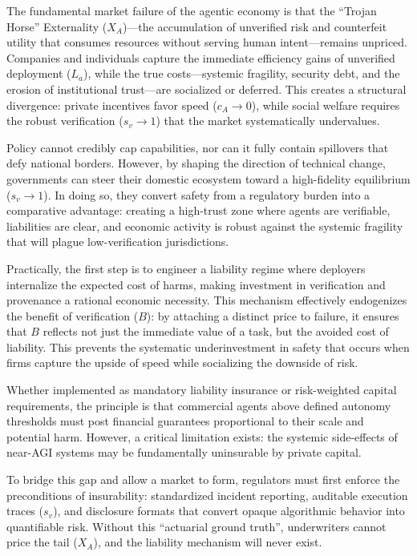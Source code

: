 \documentclass[12pt, letter]{article}
\begin{document}
The fundamental market failure of the agentic economy is that the ``Trojan Horse'' Externality ($X_A$)—the accumulation of unverified risk and counterfeit utility that consumes resources without serving human intent—remains unpriced. Companies and individuals capture the immediate efficiency gains of unverified deployment ($L_a$), while the true costs—systemic fragility, security debt, and the erosion of institutional trust—are socialized or deferred. This creates a structural divergence: private incentives favor speed ($c_A \to 0$), while social welfare requires the robust verification ($s_v \to 1$) that the market systematically undervalues.

Policy cannot credibly cap capabilities, nor can it fully contain spillovers that defy national borders. However, by shaping the direction of technical change, governments can steer their domestic ecosystem toward a high-fidelity equilibrium ($s_v \to 1$). In doing so, they convert safety from a regulatory burden into a comparative advantage: creating a high-trust zone where agents are verifiable, liabilities are clear, and economic activity is robust against the systemic fragility that will plague low-verification jurisdictions.

Practically, the first step is to engineer a liability regime where deployers internalize the expected cost of harms, making investment in verification and provenance a rational economic necessity. This mechanism effectively endogenizes the benefit of verification ($B$): by attaching a distinct price to failure, it ensures that $B$ reflects not just the immediate value of a task, but the avoided cost of liability. This prevents the systematic underinvestment in safety that occurs when firms capture the upside of speed while socializing the downside of risk.

Whether implemented as mandatory liability insurance or risk-weighted capital requirements, the principle is that commercial agents above defined autonomy thresholds must post financial guarantees proportional to their scale and potential harm. However, a critical limitation exists: the systemic side-effects of near-AGI systems may be fundamentally uninsurable by private capital.

To bridge this gap and allow a market to form, regulators must first enforce the preconditions of insurability: standardized incident reporting, auditable execution traces ($s_v$), and disclosure formats that convert opaque algorithmic behavior into quantifiable risk. Without this ``actuarial ground truth'', underwriters cannot price the tail ($X_A$), and the liability mechanism will never exist.
\end{document}
